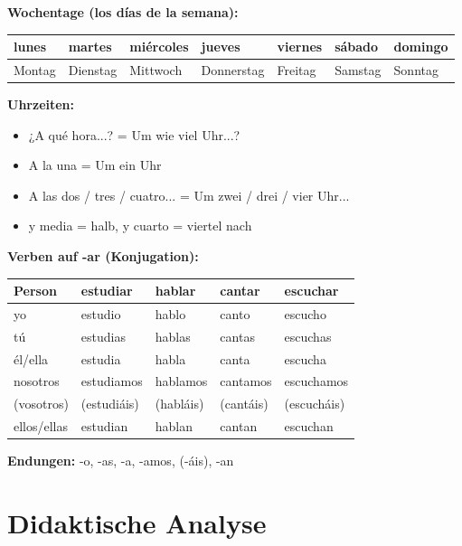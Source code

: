 \documentclass[11pt,a4paper]{article}
\begin{document}
\textbf{Wochentage (los días de la semana):}
\begin{center}
\begin{tabular}{|l|l|l|l|l|l|l|}
\hline
lunes & martes & miércoles & jueves & viernes & sábado & domingo \\
\hline
Montag & Dienstag & Mittwoch & Donnerstag & Freitag & Samstag & Sonntag \\
\hline
\end{tabular}
\end{center}

\textbf{Uhrzeiten:}
\begin{itemize}
    \item ¿A qué hora...? = Um wie viel Uhr...?
    \item A la una = Um ein Uhr
    \item A las dos / tres / cuatro... = Um zwei / drei / vier Uhr...
    \item y media = halb, y cuarto = viertel nach
\end{itemize}

\textbf{Verben auf -ar (Konjugation):}
\begin{center}
\begin{tabular}{|l|l|l|l|l|}
\hline
\textbf{Person} & \textbf{estudiar} & \textbf{hablar} & \textbf{cantar} & \textbf{escuchar} \\
\hline
yo & estudio & hablo & canto & escucho \\
tú & estudias & hablas & cantas & escuchas \\
él/ella & estudia & habla & canta & escucha \\
nosotros & estudiamos & hablamos & cantamos & escuchamos \\
(vosotros) & (estudiáis) & (habláis) & (cantáis) & (escucháis) \\
ellos/ellas & estudian & hablan & cantan & escuchan \\
\hline
\end{tabular}
\end{center}

\textbf{Endungen:} -o, -as, -a, -amos, (-áis), -an

\section{Didaktische Analyse}
\end{document}
